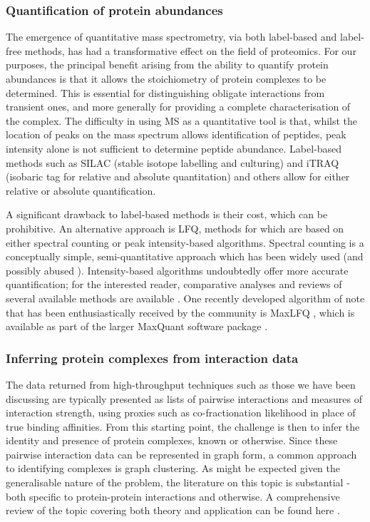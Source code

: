 \documentclass[a4paper,11pt,twoside,openright]{scrbook}
\begin{document}
\subsubsection{Quantification of protein abundances}
The emergence of quantitative mass spectrometry, via both label-based and
label-free methods, has had a transformative effect on the field of proteomics.
For our purposes, the principal benefit arising from the ability to quantify
protein abundances is that it allows the stoichiometry of protein complexes to
be determined. This is essential for distinguishing obligate interactions from
transient ones, and more generally for providing a complete characterisation of
the complex. The difficulty in using MS as a quantitative tool is that, whilst
the location of peaks on the mass spectrum allows identification of peptides,
peak intensity alone is not sufficient to determine peptide abundance.
Label-based methods such as SILAC \cite{Ong2002a} (stable isotope labelling and
culturing) and iTRAQ \cite{Ross2004} (isobaric tag for relative and absolute
quantitation) and others \cite{Gygi1999,Thompson2003} allow for either relative
or absolute quantification.

A significant drawback to label-based methods is their cost, which can be
prohibitive. An alternative approach is LFQ, methods for which are based on
either spectral counting \cite{Liu2004,Zybailov2005} or peak intensity-based
algorithms. Spectral counting is a conceptually simple, semi-quantitative
approach which has been widely used (and possibly abused \cite{Lundgren2010}).
Intensity-based algorithms undoubtedly offer more accurate quantification; for
the interested reader, comparative analyses and reviews of several available
methods are available \cite{Nahnsen2013,Fabre2014}. One recently developed
algorithm of note that has been enthusiastically received by the community is
MaxLFQ \cite{Cox2014}, which is available as part of the larger MaxQuant
software package \cite{Cox2008}.

\subsubsection{Inferring protein complexes from interaction data}
The data returned from high-throughput techniques such as those we have been
discussing are typically presented as lists of pairwise interactions and
measures of interaction strength, using proxies such as co-fractionation
likelihood in place of true binding affinities. From this starting point, the
challenge is then to infer the identity and presence of protein complexes, known
or otherwise. Since these pairwise interaction data can be represented in graph
form, a common approach to identifying complexes is graph clustering. As might
be expected given the generalisable nature of the problem, the literature on
this topic is substantial - both specific to protein-protein interactions and
otherwise. A comprehensive review of the topic covering both theory and
application can be found here \cite{Schaeffer2007}.
\end{document}
